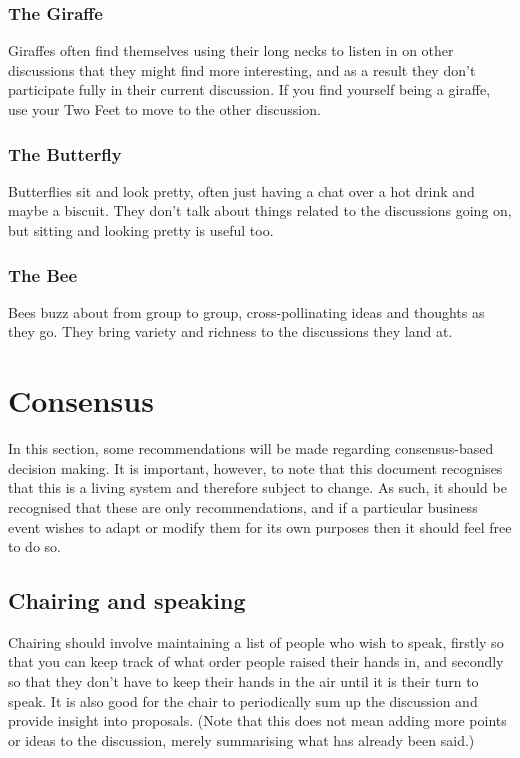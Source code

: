 \documentclass[a4paper, 11pt]{article} %
\begin{document}
\subsubsection{The Giraffe}
Giraffes often find themselves using their long necks to listen in on other discussions that they might find more interesting, and as a result they don't participate fully in their current discussion.  If you find yourself being a giraffe, use your Two Feet to move to the other discussion.

\subsubsection{The Butterfly}
Butterflies sit and look pretty, often just having a chat over a hot drink and maybe a biscuit.  They don't talk about things related to the discussions going on, but sitting and looking pretty is useful too.

\subsubsection{The Bee}
Bees buzz about from group to group, cross-pollinating ideas and thoughts as they go.  They bring variety and richness to the discussions they land at.

\section{Consensus}
\label{sec:consensus}
In this section, some recommendations will be made regarding consensus-based decision making.  It is important, however, to note that this document recognises that this is a living system and therefore subject to change.  As such, it should be recognised that these are only recommendations, and if a particular business event wishes to adapt or modify them for its own purposes then it should feel free to do so.

\subsection{Chairing and speaking}


Chairing should involve maintaining a list of people who wish to speak, firstly so that you can keep track of what order people raised their hands in, and secondly so that they don't have to keep their hands in the air until it is their turn to speak.  It is also good for the chair to periodically sum up the discussion and provide insight into proposals.  (Note that this does not mean adding more points or ideas to the discussion, merely summarising what has already been said.)
\end{document}
